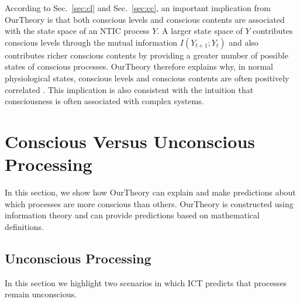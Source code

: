 \documentclass[utf8]{article}
\begin{document}
    	    
    	    According to Sec.~\ref{sec:cl} and Sec.~\ref{sec:cc}, an important implication from \ac{OurTheory} is that both conscious levels and conscious contents are associated with the state space of an NTIC process $Y$. A larger state space of $Y$ contributes conscious levels through the mutual information $I(Y_{t+1};Y_{t})$ and also contributes richer conscious contents by providing a greater number of possible states of conscious processes. 
    	    \ac{OurTheory} therefore explains why, in normal physiological states, conscious levels and conscious contents are often positively correlated \citep{laureys2005neural}. This implication is also consistent with the intuition that consciousness is often associated with complex systems.
    
	\section{Conscious Versus Unconscious Processing}\label{sec:Conscious versus Unconscious Processing}
	    In this section, we show how \ac{OurTheory} can explain and make predictions about which processes are more conscious than others. \ac{OurTheory} is constructed using information theory and can provide predictions based on mathematical definitions. 
		
        \subsection{Unconscious Processing}
            In this section we highlight two scenarios in which ICT predicts that processes remain unconscious. 
        
\end{document}
